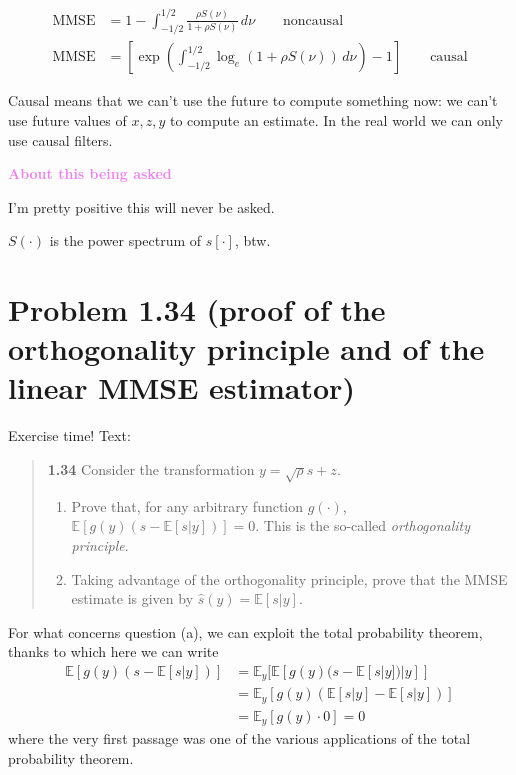 \documentclass[a4paper, 12pt]{book}
\begin{document}
\begin{align*}
\text{MMSE} &= 1 - \int_{-1/2}^{1/2} \frac{\rho S(\nu)}{1+\rho S(\nu)} \, d\nu \qquad \text{noncausal} \\
\text{MMSE} &= \left[ \exp\left( \int_{-1/2}^{1/2} \log_e(1+\rho S(\nu)) \, d\nu \right) - 1 \right] \qquad \text{causal}
\end{align*}

\begin{tcolorbox}[sharp corners, boxrule=0pt, leftrule=2pt, colframe=green!60!black, colback=green!5, left=5pt, top=3pt, bottom=3pt]
    Causal means that we can't use the future to compute something now: we can't use future values of $x, z, y$ to compute an estimate.
    In the real world we can only use causal filters.
\end{tcolorbox}

\begin{tcolorbox}[colframe=violet!80!white, colback=white, boxrule=1pt, arc=2pt]
    \textcolor{violet}{\textbf{About this being asked}}

    I'm pretty positive this will never be asked.
\end{tcolorbox}

$S(\cdot)$ is the power spectrum of $s[\cdot]$, btw.

\section*{Problem 1.34 (proof of the orthogonality principle and of the linear MMSE estimator)}

Exercise time!
Text:

\begin{quote}
\small
\textbf{1.34} Consider the transformation $y = \sqrt{\rho}s + z$.
\begin{enumerate}[label=(\alph*)]
    \item Prove that, for any arbitrary function $g(\cdot)$, $\mathbb{E}[g(y)(s - \mathbb{E}[s|y])] = 0$. This is the so-called \textit{orthogonality principle}.
    \item Taking advantage of the orthogonality principle, prove that the MMSE estimate is given by $\hat{s}(y) = \mathbb{E}[s|y]$.
\end{enumerate}
\end{quote}

For what concerns question (a), we can exploit the total probability theorem, thanks to which here we can write
\begin{align*}
\mathbb{E}[g(y)(s - \mathbb{E}[s|y])] &= \mathbb{E}_y [ \mathbb{E}[ g(y)(s - \mathbb{E}[s|y]) | y ] ] \\
&= \mathbb{E}_y [ g(y) ( \mathbb{E}[s|y] - \mathbb{E}[s|y] ) ] \\
&= \mathbb{E}_y [ g(y) \cdot 0 ] = 0
\end{align*}
where the very first passage was one of the various applications of the total probability theorem.
\end{document}
